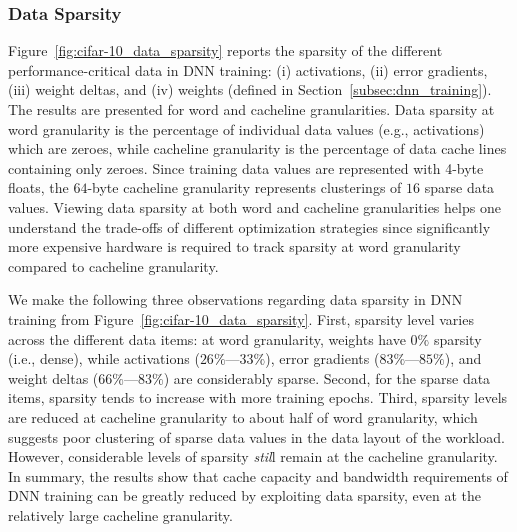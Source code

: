 \subsubsection{Data Sparsity} 
\label{subsec:data_sparsity}
Figure~\ref{fig:cifar-10_data_sparsity} reports the sparsity of the different performance-critical data in DNN training: (i) activations, (ii) error gradients, (iii) weight deltas, and (iv) weights (defined in Section~\ref{subsec:dnn_training}).  The results are presented for word and cacheline granularities.  Data sparsity at word granularity is the percentage of individual data values (e.g., activations) which are zeroes, while cacheline granularity is the percentage of data cache lines containing only zeroes.  Since training data values are represented with 4-byte floats, the $64$-byte cacheline granularity represents clusterings of $16$ sparse data values.  Viewing data sparsity at both word and cacheline granularities helps one understand the trade-offs of different optimization strategies since significantly more expensive hardware is required to track sparsity at word granularity compared to cacheline granularity.  

We make the following three observations regarding data sparsity in DNN training from Figure~\ref{fig:cifar-10_data_sparsity}.  First, sparsity level varies across the different data items: at word granularity, weights have $0\%$ sparsity (i.e., dense), while activations ($26\%$---$33\%$), error gradients ($83\%$---$85\%$), and weight deltas ($66\%$---$83\%$) are considerably sparse.   Second, for the sparse data items, sparsity tends to increase with more training epochs.  Third, sparsity levels are reduced at cacheline granularity to about half of word granularity, which suggests poor clustering of sparse data values in the data layout of the workload.  However, considerable levels of sparsity \emph{stil}l remain at the cacheline granularity.  In summary, the results show that cache capacity and bandwidth requirements of DNN training can be greatly reduced by exploiting data  sparsity, even at the relatively large cacheline granularity.

